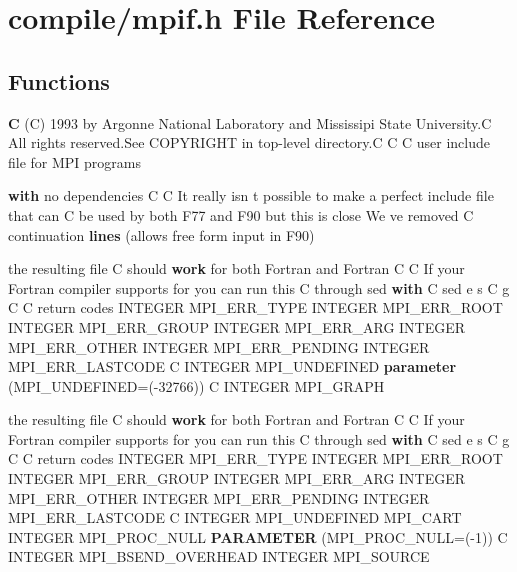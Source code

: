 \section{compile/mpif.h File Reference}
\label{mpif_8h}
\subsection*{Functions}
\begin{CompactItemize}
\item 
{\bf C} (C) 1993 by Argonne National Laboratory and Mississipi State University.C All rights reserved.See COPYRIGHT in top-level directory.C C C user include file for MPI programs
\item 
{\bf with} no dependencies C C It really isn t possible to make a perfect include file that can C be used by both F77 and F90 but this is close We ve removed C continuation {\bf lines} (allows free form input in F90)
\item 
the resulting file C should {\bf work} for both Fortran and Fortran C C If your Fortran compiler supports for you can run this C through sed {\bf with} C sed e s C g C C return codes INTEGER MPI\_\-ERR\_\-TYPE INTEGER MPI\_\-ERR\_\-ROOT INTEGER MPI\_\-ERR\_\-GROUP INTEGER MPI\_\-ERR\_\-ARG INTEGER MPI\_\-ERR\_\-OTHER INTEGER MPI\_\-ERR\_\-PENDING INTEGER MPI\_\-ERR\_\-LASTCODE C INTEGER MPI\_\-UNDEFINED {\bf parameter} (MPI\_\-UNDEFINED=(-32766)) C INTEGER MPI\_\-GRAPH
\item 
the resulting file C should {\bf work} for both Fortran and Fortran C C If your Fortran compiler supports for you can run this C through sed {\bf with} C sed e s C g C C return codes INTEGER MPI\_\-ERR\_\-TYPE INTEGER MPI\_\-ERR\_\-ROOT INTEGER MPI\_\-ERR\_\-GROUP INTEGER MPI\_\-ERR\_\-ARG INTEGER MPI\_\-ERR\_\-OTHER INTEGER MPI\_\-ERR\_\-PENDING INTEGER MPI\_\-ERR\_\-LASTCODE C INTEGER MPI\_\-UNDEFINED MPI\_\-CART INTEGER MPI\_\-PROC\_\-NULL {\bf PARAMETER} (MPI\_\-PROC\_\-NULL=(-1)) C INTEGER MPI\_\-BSEND\_\-OVERHEAD INTEGER MPI\_\-SOURCE
\end{CompactItemize}
